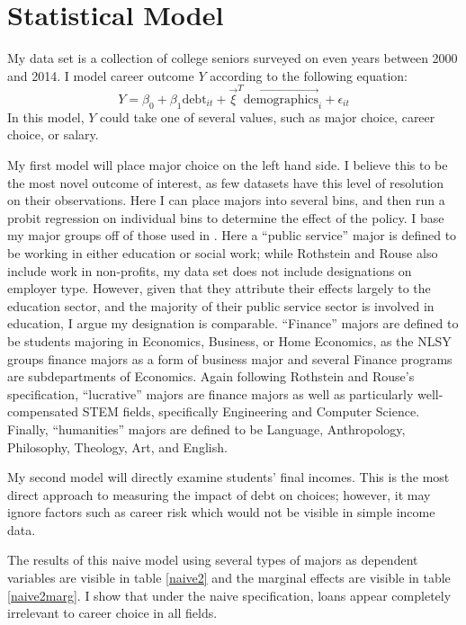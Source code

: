 \documentclass[12pt]{article}
\begin{document}
	\section{Statistical Model}
	
	My data set is a collection of college seniors surveyed on even years between 2000 and 2014. I model career outcome $Y$ according to the following equation: 
	\begin{equation}
	Y = \beta_0 + \beta_1 \mbox{debt}_{it} + \vec{\xi}^T \vec{\mbox{demographics}}_i + \epsilon_{it} \label{naiveeq}
	\end{equation} 
	In this model, $Y$ could take one of several values, such as major choice, career choice, or salary. 
	
	My first model will place major choice on the left hand side. I believe this to be the most novel outcome of interest, as few datasets have this level of resolution on their observations. Here I can place majors into several bins, and then run a probit regression on individual bins to determine the effect of the policy. I base my major groups off of those used in \textcite{rothstein2011}. Here a ``public service'' major is defined to be working in either education or social work; while Rothstein and Rouse also include work in non-profits, my data set does not include designations on employer type. However, given that they attribute their effects largely to the education sector, and the majority of their public service sector is involved in education, I argue my designation is comparable. ``Finance'' majors are defined to be students majoring in Economics, Business, or Home Economics, as the NLSY groups finance majors as a form of business major and several Finance programs are subdepartments of Economics. Again following Rothstein and Rouse's specification, ``lucrative'' majors are finance majors as well as particularly well-compensated STEM fields, specifically Engineering and Computer Science. Finally, ``humanities'' majors are defined to be Language, Anthropology, Philosophy, Theology, Art, and English.
	
	My second model will directly examine students' final incomes. This is the most direct approach to measuring the impact of debt on choices; however, it may ignore factors such as career risk which would not be visible in simple income data.
	
	The results of this naive model using several types of majors as dependent variables are visible in table \ref{naive2} and the marginal effects are visible in table \ref{naive2marg}. I show that under the naive specification, loans appear completely irrelevant to career choice in all fields.
	
\end{document}
